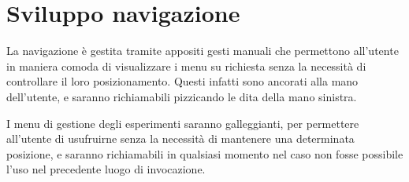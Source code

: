 \section{Sviluppo navigazione}
\label{sec:navigazione}

La navigazione è gestita tramite appositi gesti manuali che permettono all'utente
in maniera comoda di visualizzare i menu su richiesta senza la necessità di controllare
il loro posizionamento. Questi infatti sono ancorati alla mano dell'utente, e saranno
richiamabili pizzicando le dita della mano sinistra.

I menu di gestione degli esperimenti saranno galleggianti, per permettere all'utente
di usufruirne senza la necessità di mantenere una determinata posizione, e saranno
richiamabili in qualsiasi momento nel caso non fosse possibile l'uso nel precedente
luogo di invocazione.